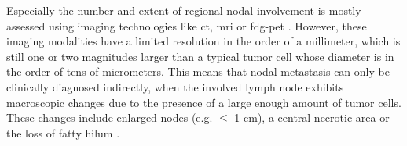 \documentclass[\relativeRoot/main.tex]{subfiles}
\begin{document}
Especially the number and extent of regional nodal involvement is mostly assessed using imaging technologies like \gls{ct}, \gls{mri} or \gls{fdg-pet} \cite{johnson_head_2020,van_den_bosch_18f-fdg-petct-based_2020}. However, these imaging modalities have a limited resolution in the order of a millimeter, which is still one or two magnitudes larger than a typical tumor cell whose diameter is in the order of tens of micrometers. This means that nodal metastasis can only be clinically diagnosed indirectly, when the involved lymph node exhibits macroscopic changes due to the presence of a large enough amount of tumor cells. These changes include enlarged nodes (e.g. $\leq$ 1 cm), a central necrotic area or the loss of fatty hilum \cite{pillsbury_iii_rationale_1997,biau_selection_2019,ludwig_dataset_2021}.
\end{document}
